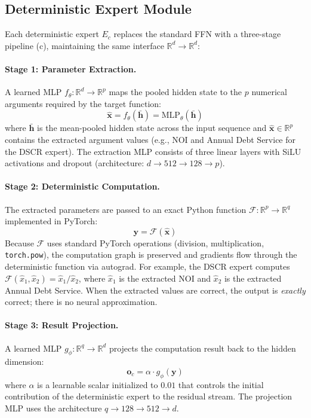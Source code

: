 \subsection{Deterministic Expert Module}
\label{sec:method:expert}

Each deterministic expert $E_c$ replaces the standard FFN with a
three-stage pipeline (c), maintaining the same
interface $\mathbb{R}^d \to \mathbb{R}^d$:

\paragraph{Stage 1: Parameter Extraction.}
A learned MLP $f_\theta: \mathbb{R}^d \to \mathbb{R}^p$ maps the
pooled hidden state to the $p$ numerical arguments required by the
target function:
\begin{equation}
    \hat{\mathbf{x}} = f_\theta(\bar{\mathbf{h}})
    = \text{MLP}_{\theta}(\bar{\mathbf{h}})
\label{eq:extraction}
\end{equation}
where $\bar{\mathbf{h}}$ is the mean-pooled hidden state across the
input sequence and $\hat{\mathbf{x}} \in \mathbb{R}^p$ contains the
extracted argument values (e.g., NOI and Annual Debt Service for the
DSCR expert). The extraction MLP consists of three linear layers with
SiLU activations and dropout (architecture:
$d \to 512 \to 128 \to p$).

\paragraph{Stage 2: Deterministic Computation.}
The extracted parameters are passed to an exact Python function
$\mathcal{F}: \mathbb{R}^p \to \mathbb{R}^q$ implemented in PyTorch:
\begin{equation}
    \mathbf{y} = \mathcal{F}(\hat{\mathbf{x}})
\label{eq:computation}
\end{equation}
Because $\mathcal{F}$ uses standard PyTorch operations (division,
multiplication, \texttt{torch.pow}), the computation graph is preserved
and gradients flow through the deterministic function via autograd.
For example, the DSCR expert computes
$\mathcal{F}(\hat{x}_1, \hat{x}_2) = \hat{x}_1 / \hat{x}_2$,
where $\hat{x}_1$ is the extracted NOI and $\hat{x}_2$ is the
extracted Annual Debt Service. When the extracted values are correct,
the output is \emph{exactly} correct; there is no neural
approximation.

\paragraph{Stage 3: Result Projection.}
A learned MLP $g_\phi: \mathbb{R}^q \to \mathbb{R}^d$ projects the
computation result back to the hidden dimension:
\begin{equation}
    \mathbf{o}_c = \alpha \cdot g_\phi(\mathbf{y})
\label{eq:projection}
\end{equation}
where $\alpha$ is a learnable scalar initialized to $0.01$ that
controls the initial contribution of the deterministic expert to the
residual stream. The projection MLP uses the architecture
$q \to 128 \to 512 \to d$.

